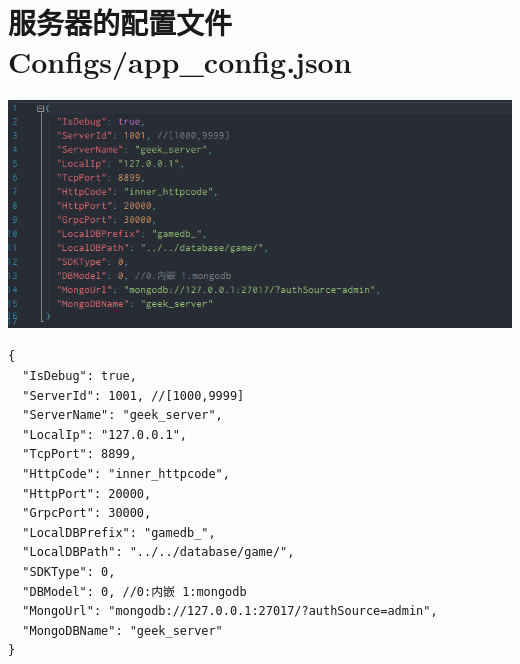 \documentclass[9pt, b5paper]{article}
\begin{document}
\section{服务器的配置文件 Configs/app\_config.json}
\label{sec-5}

\includegraphics[width=.9\linewidth]{./pic/readme_20230101_180011.png}
\begin{verbatim}
{
  "IsDebug": true,
  "ServerId": 1001, //[1000,9999]
  "ServerName": "geek_server",
  "LocalIp": "127.0.0.1",
  "TcpPort": 8899,
  "HttpCode": "inner_httpcode",
  "HttpPort": 20000,
  "GrpcPort": 30000,
  "LocalDBPrefix": "gamedb_",
  "LocalDBPath": "../../database/game/",
  "SDKType": 0,
  "DBModel": 0, //0:内嵌 1:mongodb
  "MongoUrl": "mongodb://127.0.0.1:27017/?authSource=admin",
  "MongoDBName": "geek_server"
}
\end{verbatim}
\end{document}
